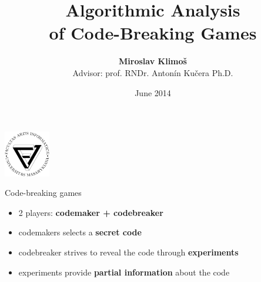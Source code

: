 \documentclass{beamer}
\title{Algorithmic Analysis\\ of Code-Breaking Games}
\author{\textbf{Miroslav Klimoš} \\\medskip Advisor: prof. RNDr. Antonín Kučera Ph.D.}
\date{June 2014}
\begin{document}
\begin{frame}[plain]
\begin{center}
\includegraphics[width=20mm]{logo_fi.pdf}
\end{center}
\vspace{-5mm}
\maketitle
\end{frame}

\begin{frame}{Code-breaking games}
\begin{itemize}\itemsep 10pt
\item 2 players: \textbf{codemaker + codebreaker}
\item codemakers selects a \textbf{secret code}
\item codebreaker strives to reveal the code through \textbf{experiments}
\item experiments provide \textbf{partial information} about the code
\end{itemize}
\end{frame}
\end{document}
